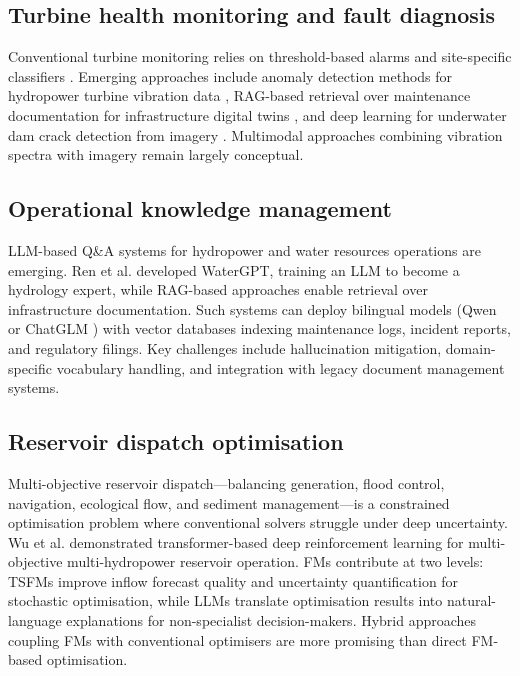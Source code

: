 \documentclass[preprint,12pt]{elsarticle}
\begin{document}
\subsection{Turbine health monitoring and fault diagnosis}
\label{subsec:turbine_health}

Conventional turbine monitoring relies on threshold-based alarms and site-specific classifiers \cite{latif2023dl_inflow_review}. Emerging approaches include anomaly detection methods for hydropower turbine vibration data \cite{ma2022hydro_turbine_anomaly}, RAG-based retrieval over maintenance documentation for infrastructure digital twins \cite{ieva2024rag_infrastructure}, and deep learning for underwater dam crack detection from imagery \cite{li2022underwater_dam_crack}. Multimodal approaches combining vibration spectra with imagery remain largely conceptual.

\subsection{Operational knowledge management}
\label{subsec:hydro_knowledge}

LLM-based Q\&A systems for hydropower and water resources operations are emerging. Ren et al. \cite{ren2024watergpt} developed WaterGPT, training an LLM to become a hydrology expert, while RAG-based approaches \cite{ieva2024rag_infrastructure} enable retrieval over infrastructure documentation. Such systems can deploy bilingual models (Qwen \cite{bai2023qwen} or ChatGLM \cite{du2022glm, zeng2023glm130b}) with vector databases indexing maintenance logs, incident reports, and regulatory filings. Key challenges include hallucination mitigation, domain-specific vocabulary handling, and integration with legacy document management systems.

\subsection{Reservoir dispatch optimisation}
\label{subsec:dispatch}

Multi-objective reservoir dispatch---balancing generation, flood control, navigation, ecological flow, and sediment management---is a constrained optimisation problem where conventional solvers struggle under deep uncertainty. Wu et al. \cite{wu2024transformer_drl_reservoir} demonstrated transformer-based deep reinforcement learning for multi-objective multi-hydropower reservoir operation. FMs contribute at two levels: TSFMs improve inflow forecast quality and uncertainty quantification for stochastic optimisation, while LLMs translate optimisation results into natural-language explanations for non-specialist decision-makers. Hybrid approaches coupling FMs with conventional optimisers are more promising than direct FM-based optimisation.
\end{document}
